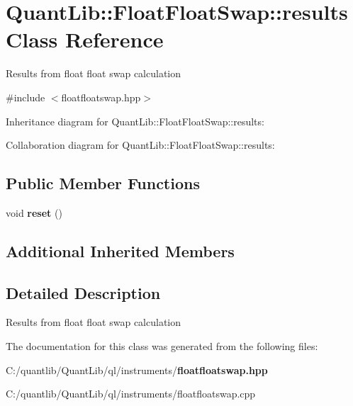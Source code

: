 \section{Quant\+Lib\+:\+:Float\+Float\+Swap\+:\+:results Class Reference}
\label{class_quant_lib_1_1_float_float_swap_1_1results}


Results from float float swap calculation  




{\ttfamily \#include $<$floatfloatswap.\+hpp$>$}



Inheritance diagram for Quant\+Lib\+:\+:Float\+Float\+Swap\+:\+:results\+:


Collaboration diagram for Quant\+Lib\+:\+:Float\+Float\+Swap\+:\+:results\+:
\subsection*{Public Member Functions}
\begin{DoxyCompactItemize}
\item 
void {\bfseries reset} ()\label{class_quant_lib_1_1_float_float_swap_1_1results_a6eb182cd90df89dbb9f31d27854125f1}

\end{DoxyCompactItemize}
\subsection*{Additional Inherited Members}


\subsection{Detailed Description}
Results from float float swap calculation 

The documentation for this class was generated from the following files\+:\begin{DoxyCompactItemize}
\item 
C\+:/quantlib/\+Quant\+Lib/ql/instruments/{\bf floatfloatswap.\+hpp}\item 
C\+:/quantlib/\+Quant\+Lib/ql/instruments/floatfloatswap.\+cpp\end{DoxyCompactItemize}
